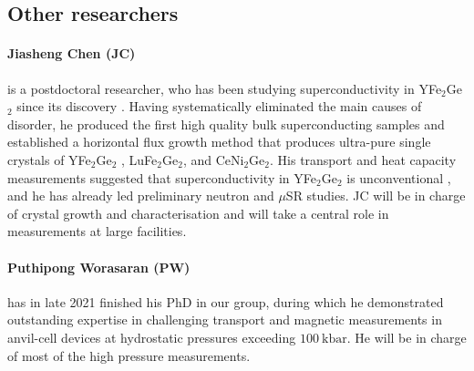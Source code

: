 \subsection*{Other researchers}
\paragraph{Jiasheng Chen (JC)} is a postdoctoral researcher, who 
has been studying superconductivity in YFe$_2$Ge$_2$ since its discovery . Having systematically eliminated the main causes of disorder, he produced the first high quality bulk superconducting samples   and established a horizontal flux growth method that produces ultra-pure single crystals of YFe$_2$Ge$_2$ , LuFe$_2$Ge$_2$, and CeNi$_2$Ge$_2$. His transport and heat capacity measurements suggested that superconductivity in YFe$_2$Ge$_2$ is unconventional , and he has already led preliminary neutron and $\mu$SR studies. 
JC will be in charge of crystal growth and characterisation and will take a central role in measurements at large facilities.


\paragraph{Puthipong Worasaran (PW)} has in late 2021 finished his PhD in our group, during which he demonstrated outstanding expertise in challenging transport and magnetic measurements in anvil-cell devices at hydrostatic pressures exceeding $\SI{100}{\kilo\bar}$. He will be in charge of most of the high pressure measurements.


